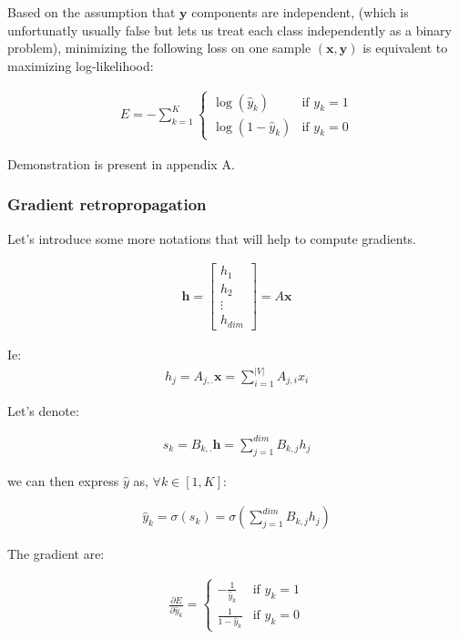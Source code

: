 Based on the assumption that $\mathbf{y}$ components are independent, (which is unfortunatly usually false but lets us treat each class independently as a binary problem), minimizing the following loss on one sample $(\mathbf{x}, \mathbf{y})$ is equivalent to maximizing log-likelihood:

\begin{align}
	E = - \sum_{k=1}^K
  			  	\left\{
				    \begin{array}{ll}
				        \log (\hat y_k) & \mbox{if } y_k =1 \\
				        \log (1 - \hat y_k) & \mbox{if } y_k =0
				    \end{array}
				\right.
\end{align}

Demonstration is present in appendix A.


\subsubsection{Gradient retropropagation}

Let's introduce some more notations that will help to compute gradients.

\begin{align}
	\mathbf{h}
	= \begin{bmatrix} 
		h_1 \\
		h_2 \\
		\vdots \\
		h_{\textit{dim}}
	\end{bmatrix}
	= A\mathbf{x}
\end{align}

Ie:
\begin{align}
	h_j = A_{j, .}\mathbf{x} = \sum_{i=1}^{\textit{|V|}} A_{j,i} x_i 
\end{align}


Let's denote:

\begin{align}
	s_k  = B_{k,.} \mathbf{h} = \sum_{j=1}^{\textit{dim}} B_{k,j} h_j 
\end{align}

we can then express $\hat y$ as, $\forall k \in [1, K]$:

\begin{align}
	\hat y_k  = \sigma(s_k) = \sigma( \sum_{j=1}^{dim} B_{k, j} h_j) 
\end{align}


The gradient are:

\begin{align}
	\frac{ \partial E } { \partial \hat y_k } = 
		\left\{
		    \begin{array}{ll}
		        - \frac{1}{\hat y_k} & \mbox{if } y_k =1 \\
		        \frac{1}{1 - \hat y_k} & \mbox{if } y_k =0
		    \end{array}
		\right.
\end{align}


